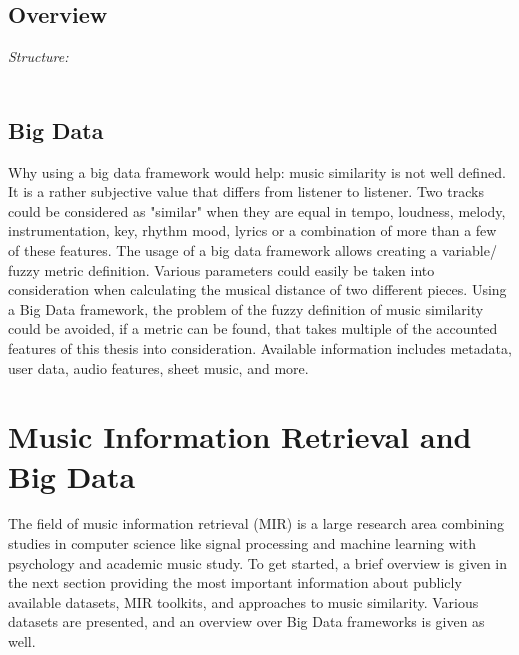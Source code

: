\section{Overview}

\textit{Structure: \\}
\ \\
\begin{figure}[htbp]
	\centering
\end{figure}

\section{Big Data}

Why using a big data framework would help: 
music similarity is not well defined. It is a rather subjective value that differs from listener to listener. 
Two tracks could be considered as "similar" when they are equal in tempo, loudness, melody, instrumentation, key, rhythm mood, lyrics or a combination of more than a few of these features. The usage of a big data framework allows creating a variable/ fuzzy metric definition. Various parameters could easily be taken into consideration when calculating the musical distance of two different pieces. 
Using a Big Data framework, the problem of the fuzzy definition of music similarity could be avoided, if a metric can be found, that takes multiple of the accounted features of this thesis into consideration.
Available information includes metadata, user data, audio features, sheet music, and more.

\chapter{Music Information Retrieval and Big Data}\label{audiofeat}

The field of music information retrieval (MIR) is a large research area combining studies in computer science like signal processing and machine learning with psychology and academic music study. To get started, a brief overview is given in the next section providing the most important information about publicly available datasets, MIR toolkits, and approaches to music similarity. Various datasets are presented, and an overview over Big Data frameworks is given as well.

